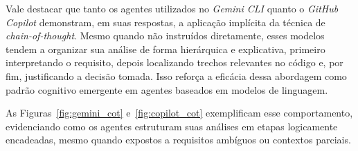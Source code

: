 Vale destacar que tanto os agentes utilizados no \textit{Gemini CLI} quanto o \textit{GitHub Copilot} demonstram, em suas respostas, a aplicação implícita da técnica de \textit{chain-of-thought}. Mesmo quando não instruídos diretamente, esses modelos tendem a organizar sua análise de forma hierárquica e explicativa, primeiro interpretando o requisito, depois localizando trechos relevantes no código e, por fim, justificando a decisão tomada. Isso reforça a eficácia dessa abordagem como padrão cognitivo emergente em agentes baseados em modelos de linguagem.

As Figuras~\ref{fig:gemini_cot} e~\ref{fig:copilot_cot} exemplificam esse comportamento, evidenciando como os agentes estruturam suas análises em etapas logicamente encadeadas, mesmo quando expostos a requisitos ambíguos ou contextos parciais.

